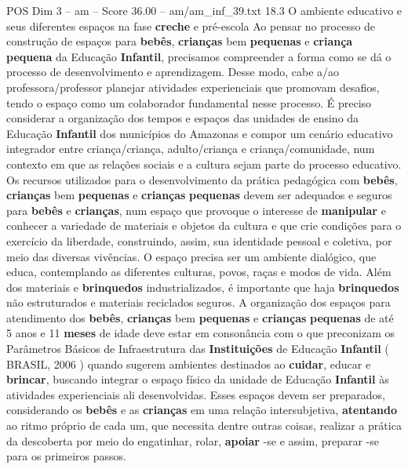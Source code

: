 \begin{textsample}{POS Dim 3 – am – Score 36.00 – am/am\_inf\_39.txt}  \label{ex:f3_pos_034}
18.3 O ambiente educativo e seus diferentes espaços na fase \textbf{creche} e pré-escola Ao pensar no processo de construção de espaços para \textbf{bebês}, \textbf{crianças} bem \textbf{pequenas} e \textbf{criança} \textbf{pequena} da Educação \textbf{Infantil}, precisamos compreender a forma como se dá o processo de desenvolvimento e aprendizagem.
Desse modo, cabe a/ao professora/professor planejar atividades experienciais que promovam desafios, tendo o espaço como um colaborador fundamental nesse processo.
É preciso considerar a organização dos tempos e espaços das unidades de ensino da Educação \textbf{Infantil} dos municípios do Amazonas e compor um cenário educativo integrador entre criança/criança, adulto/criança e criança/comunidade, num contexto em que as relações sociais e a cultura sejam parte do processo educativo.
Os recursos utilizados para o desenvolvimento da prática pedagógica com \textbf{bebês}, \textbf{crianças} bem \textbf{pequenas} e \textbf{crianças} \textbf{pequenas} devem ser adequados e seguros para \textbf{bebês} e \textbf{crianças}, num espaço que provoque o interesse de \textbf{manipular} e conhecer a variedade de materiais e objetos da cultura e que crie condições para o exercício da liberdade, construindo, assim, sua identidade pessoal e coletiva, por meio das diversas vivências.
O espaço precisa ser um ambiente dialógico, que educa, contemplando as diferentes culturas, povos, raças e modos de vida.
Além dos materiais e \textbf{brinquedos} industrializados, é importante que haja \textbf{brinquedos} não estruturados e materiais reciclados seguros.
A organização dos espaços para atendimento dos \textbf{bebês}, \textbf{crianças} bem \textbf{pequenas} e \textbf{crianças} \textbf{pequenas} de até 5 anos e 11 \textbf{meses} de idade deve estar em consonância com o que preconizam os Parâmetros Básicos de Infraestrutura das \textbf{Instituições} de Educação \textbf{Infantil} ( BRASIL, 2006 ) quando sugerem ambientes destinados ao \textbf{cuidar}, educar e \textbf{brincar}, buscando integrar o espaço físico da unidade de Educação \textbf{Infantil} às atividades experienciais ali desenvolvidas.
Esses espaços devem ser preparados, considerando os \textbf{bebês} e as \textbf{crianças} em uma relação intersubjetiva, \textbf{atentando} ao ritmo próprio de cada um, que necessita dentre outras coisas, realizar a prática da descoberta por meio do engatinhar, rolar, \textbf{apoiar} -se e assim, preparar -se para os primeiros passos.

\end{textsample}

